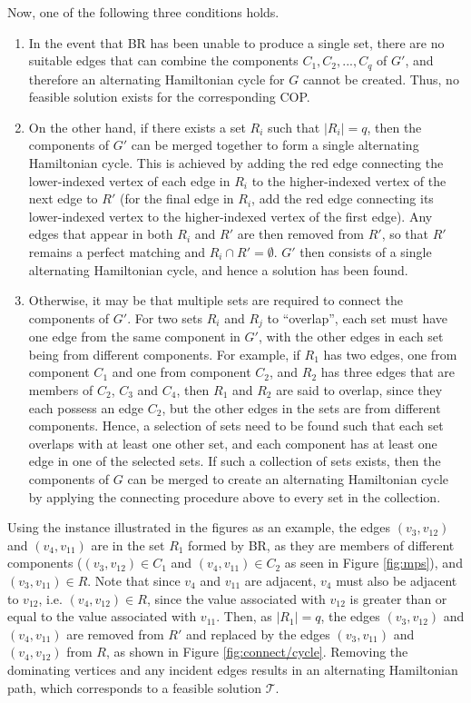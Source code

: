 \documentclass[oribibl]{llncs}
\begin{document}
Now, one of the following three conditions holds.
\begin{enumerate}
\item In the event that BR has been unable to produce a single set, there are no suitable edges that can combine the components $C_1, C_2, ..., C_q$ of $G'$, and therefore an alternating Hamiltonian cycle for $G$ cannot be created. Thus, no feasible solution exists for the corresponding COP.

\item On the other hand, if there exists a set $R_i$ such that $|R_i| = q$, then the components of $G'$ can be merged together to form a single alternating Hamiltonian cycle. This is achieved by adding the red edge connecting the lower-indexed vertex of each edge in $R_i$ to the higher-indexed vertex of the next edge to $R'$ (for the final edge in $R_i$, add the red edge connecting its lower-indexed vertex to the higher-indexed vertex of the first edge). Any edges that appear in both $R_i$ and $R'$ are then removed from $R'$, so that $R'$ remains a perfect matching and $R_i \cap R' = \emptyset$. $G'$ then consists of a single alternating Hamiltonian cycle, and hence a solution has been found.


\item Otherwise, it may be that multiple sets are required to connect the components of $G'$. For two sets $R_i$ and $R_j$ to ``overlap'', each set must have one edge from the same component in $G'$, with the other edges in each set being from different components. For example, if $R_1$ has two edges, one from component $C_1$ and one from component $C_2$, and $R_2$ has three edges that are members of $C_2$, $C_3$ and $C_4$, then $R_1$ and $R_2$ are said to overlap, since they each possess an edge $C_2$, but the other edges in the sets are from different components. Hence, a selection of sets need to be found such that each set overlaps with at least one other set, and each component has at least one edge in one of the selected sets. If such a collection of sets exists, then the components of $G$ can be merged to create an alternating Hamiltonian cycle by applying the connecting procedure above to every set in the collection.
\end{enumerate}
Using the instance illustrated in the figures as an example, the edges $(v_3, v_{12})$ and $(v_4, v_{11})$ are in the set $R_1$ formed by BR, as they are members of different components ($(v_3, v_{12}) \in C_1$ and $(v_4, v_{11}) \in C_2$ as seen in Figure \ref{fig:mps}), and $(v_3, v_{11}) \in R$. Note that since $v_4$ and $v_{11}$ are adjacent, $v_4$ must also be adjacent to $v_{12}$, i.e. $(v_4, v_{12}) \in R$, since the value associated with $v_{12}$ is greater than or equal to the value associated with $v_{11}$. Then, as $|R_1| = q$, the edges $(v_3, v_{12})$ and $(v_4, v_{11})$ are removed from $R'$ and replaced by the edges $(v_3, v_{11})$ and $(v_4, v_{12})$ from $R$, as shown in Figure \ref{fig:connect/cycle}. Removing the dominating vertices and any incident edges results in an alternating Hamiltonian path, which corresponds to a feasible solution $\mathcal{T}$. 
\end{document}
